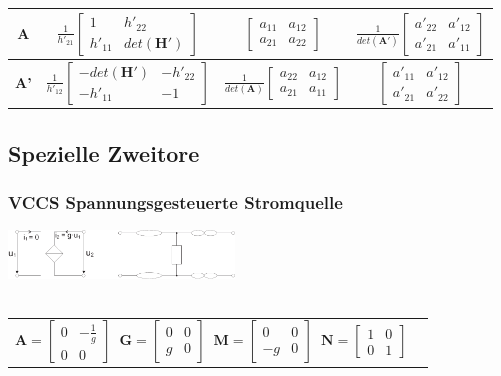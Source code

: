 \documentclass[a4paper,twocolumn,10pt]{article}
\begin{document}
{\begin{tabular}{@{}|@{}c@{}|@{}c@{}|@{}c@{}|@{}c@{}|}
\hline \textbf{A} & $\frac{1}{h'_{21}}\begin{bmatrix}1 & h'_{22}\\ h'_{11} & det(\textbf{H}')\end{bmatrix}$ & $\begin{bmatrix}a_{11} & a_{12}\\ a_{21} & a_{22}\end{bmatrix}$ & $\frac{1}{det(\textbf{A}')}\begin{bmatrix}a'_{22} & a'_{12}\\ a'_{21} & a'_{11}\end{bmatrix}$\\
\hline \textbf{A'} & $\frac{1}{h'_{12}}\begin{bmatrix}-det(\textbf{H}') & -h'_{22}\\ -h'_{11} & -1\end{bmatrix}$ & $\frac{1}{det(\textbf{A})}\begin{bmatrix}a_{22} & a_{12}\\ a_{21} & a_{11}\end{bmatrix}$ & $\begin{bmatrix}a'_{11} & a'_{12}\\ a'_{21} & a'_{22}\end{bmatrix}$\\
\hline 
\end{tabular}}

\subsection*{Spezielle Zweitore}
\subsubsection*{VCCS Spannungsgesteuerte Stromquelle}
\includegraphics[width=0.45\textwidth]{img/OP_USI}\\\\
\begin{tabular}{ll}
$\textbf{A}=\begin{bmatrix}0 & -\frac{1}{g}\\ 0 & 0\end{bmatrix}\;\;\textbf{G}=\begin{bmatrix}0 & 0\\ g & 0\end{bmatrix}\;\;\textbf{M}=\begin{bmatrix}0 & 0\\ -g & 0\end{bmatrix}\;\;\textbf{N}=\begin{bmatrix}1 & 0\\ 0 & 1\end{bmatrix}$
\end{tabular}
\end{document}
